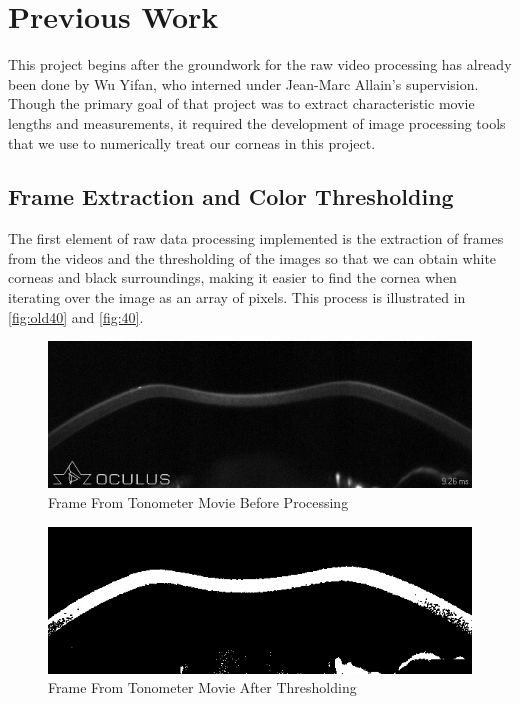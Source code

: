 \documentclass[epjST]{svjour}
\begin{document}
\section{Previous Work}
This project begins after the groundwork for the raw video processing has already been done by Wu Yifan, who interned under Jean-Marc Allain's supervision. Though the primary goal of that project was to extract characteristic movie lengths and measurements, it required the development of image processing tools that we use to numerically treat our corneas in this project.
\subsection{Frame Extraction and Color Thresholding}
The first element of raw data processing implemented is the extraction of frames from the videos and the thresholding of the images so that we can obtain white corneas and black surroundings, making it easier to find the cornea when iterating over the image as an array of pixels. This process is illustrated in \autoref{fig:old40} and \autoref{fig:40}.
\begin{figure}[h]
    \centering
    \includegraphics[width=0.6\linewidth]{figures/processing/image40old.jpg}
    \caption{Frame From Tonometer Movie Before Processing}
    \label{fig:old40}
\end{figure}
\begin{figure}[h]
    \centering
    \includegraphics[width=0.6\linewidth]{figures/processing/image40.jpg}
    \caption{Frame From Tonometer Movie After Thresholding}
    \label{fig:40}
\end{figure}
\end{document}
